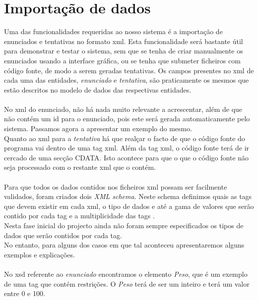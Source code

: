 \section{Importação de dados}\label{sec xml}

Uma das funcionalidades requeridas ao nosso sistema é a importação de enunciados e tentativas no formato xml.
Esta funcionalidade será bastante útil para demonstrar e testar o sistema, sem que se tenha de criar manualmente os enunciados
 usando a interface gráfica, ou se tenha que submeter ficheiros com código fonte, de modo a serem geradas tentativas.
Os campos presentes no xml de cada uma das entidades, \textit{enunciado} e \textit{tentativa}, são praticamente os mesmos 
que estão descritos no modelo de dados das respectivas entidades.\\
\\
No xml do enunciado, não há nada muito relevante a acrescentar, além de que não contém um id para o enunciado, pois este será gerada 
automaticamente pelo sistema. Passamos agora a apresentar um exemplo do mesmo.
\\



Quanto ao xml para a \textit{tentativa} há que realçar o facto de que o código fonte do programa vai dentro de uma tag xml.  Além da tag xml, o código fonte
terá de ir cercado de uma secção CDATA. Isto acontece para que o que o código fonte não seja processado com o restante xml que o contém.\\
\\




Para que todos os dados contidos nos ficheiros xml possam ser facilmente validados, foram criados dois \textit{XML schema}.
Neste schema definimos quais as tags que devem existir em cada xml, o tipo de dados e até a gama de valores que serão contido por cada tag e
 a multiplicidade das tags .\\

Nesta fase inicial do projecto ainda não foram sempre especificados  os tipos de dados que serão contidos por cada tag.\\
No entanto, para alguns dos casos em que tal aconteceu apresentaremos alguns exemplos e explicações.\\
\\
No xsd referente ao \textit{enunciado} encontramos o elemento \textit{Peso}, que é um exemplo de uma tag que contém restrições.
O \textit{Peso} terá de ser um inteiro e terá um valor entre 0 e 100.

